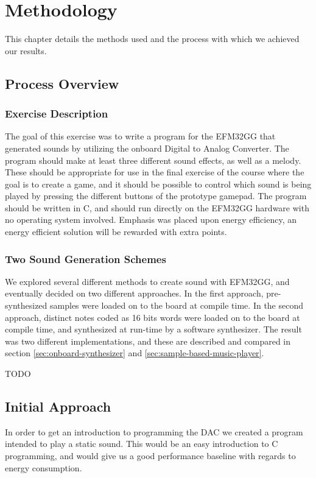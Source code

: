 \chapter{Methodology}
This chapter details the methods used and the process with which we achieved our results.

\section{Process Overview} %

\subsection{Exercise Description}
The goal of this exercise was to write a program for the EFM32GG that generated sounds by utilizing the onboard Digital to Analog Converter. The program should make at least three different sound effects, as well as a melody. These should be appropriate for use in the final exercise of the course where the goal is to create a game, and it should be possible to control which sound is being played by pressing the different buttons of the prototype gamepad. The program should be written in C, and should run directly on the EFM32GG hardware with no operating system involved. Emphasis was placed upon energy efficiency, an energy efficient solution will be rewarded with extra points.

\subsection{Two Sound Generation Schemes}
We explored several different methods to create sound with EFM32GG, and eventually decided on two different approaches. In the first approach, pre-synthesized samples were loaded on to the board at compile time. In the second approach, distinct notes coded as 16 bits words were loaded on to the board at compile time, and synthesized at run-time by a software synthesizer. The result was two different implementations, and these are described and compared in section \ref{sec:onboard-synthesizer} and \ref{sec:sample-based-music-player}.

TODO %


\section{Initial Approach}
In order to get an introduction to programming the DAC we created a program intended to play a static sound. This would be an easy introduction to C programming, and would give us a good performance baseline with regards to energy consumption.

